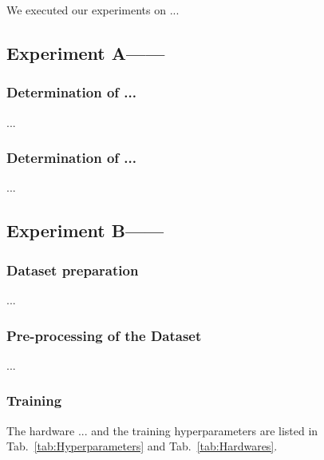 We executed our experiments on ...


\subsection{Experiment A——}

\subsubsection{Determination of ...}
...

\subsubsection{Determination of ...}
...


\subsection{Experiment B——}

\subsubsection{Dataset preparation}
... 

\subsubsection{Pre-processing of the Dataset}
...


\subsubsection{Training}
The hardware ... and the training hyperparameters are listed in Tab.~\ref{tab:Hyperparameters} and Tab.~\ref{tab:Hardwares}.

\begin{table}[htb]
\centering
\caption{Hardwares and their parameters}
\label{tab:Hardwares}
\end{table}

